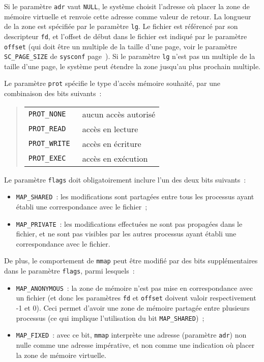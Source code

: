 \documentclass [twoside] {report}
\begin{document}
Si le paramètre \texttt {adr} vaut \texttt {NULL}, le système choisit
l'adresse où placer la zone de mémoire virtuelle et renvoie cette
adresse comme valeur de retour. La longueur de la zone est spécifiée
par le paramètre \texttt {lg}. Le fichier est référencé par son
descripteur \texttt {fd}, et l'offset de début dans le fichier est
indiqué par le paramètre \texttt {offset} (qui doit être un multiple
de la taille d'une page, voir le paramètre \texttt {SC\_PAGE\_SIZE}
de {\tt sysconf} page~\pageref {sysconf}). Si le paramètre \texttt {lg}
n'est pas un multiple de la taille d'une page, le système peut étendre
la zone jusqu'au plus prochain multiple.

Le paramètre \texttt {prot} spécifie le type d'accès mémoire
souhaité, par une combinaison des bits suivants~:

\begin {quote}
    \begin {tabular} {|ll|} \hline
	\tt PROT\_NONE & aucun accès autorisé \\
	\tt PROT\_READ & accès en lecture \\
	\tt PROT\_WRITE & accès en écriture \\
	\tt PROT\_EXEC & accès en exécution \\
	\hline
    \end {tabular}
\end {quote}

Le paramètre \texttt {flags} doit obligatoirement inclure l'un des deux
bits suivants~:

\begin {itemize}
    \item \texttt {MAP\_SHARED}~: les modifications sont partagées entre
	tous les processus ayant établi une correspondance avec le
	fichier~;
    \item \texttt {MAP\_PRIVATE}~: les modifications effectuées ne sont
	pas propagées dans le fichier, et ne sont pas visibles par les
	autres processus ayant établi une correspondance avec le fichier.

\end {itemize}

De plus, le comportement de \texttt {mmap} peut être modifié par des
bits supplémentaires dans le paramètre \texttt {flags}, parmi lesquels~:

\begin {itemize}
    \item \texttt {MAP\_ANONYMOUS}~: la zone de mémoire n'est pas mise
	en correspondance avec un fichier (et donc les paramètres
	\texttt {fd} et \texttt {offset} doivent valoir respectivement
	-1 et 0).  Ceci permet d'avoir une zone de mémoire partagée
	entre plusieurs processus (ce qui implique l'utilisation du bit
	\texttt {MAP\_SHARED})~;

    \item \texttt {MAP\_FIXED}~: avec ce bit, \texttt {mmap} interprète
	une adresse (paramètre \texttt {adr}) non nulle comme une
	adresse impérative, et non comme une indication où placer la
	zone de mémoire virtuelle.

\end {itemize}
\end{document}
